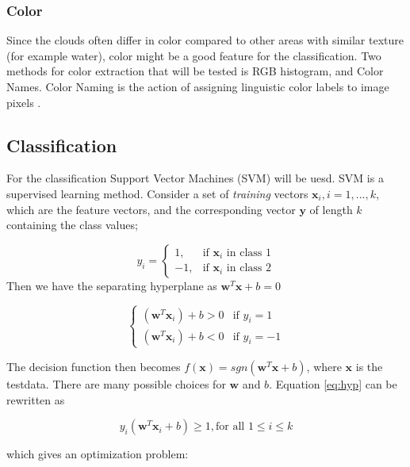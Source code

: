 \documentclass{article}
\begin{document}
\subsubsection{Color}
Since the clouds often differ in color compared to other areas with similar texture (for example water), color might be a good feature for the classification. Two methods for color extraction that will be tested is RGB histogram, and Color Names. Color Naming is the action of assigning linguistic color labels to image pixels \citep{colornames}.


\subsection{Classification}
For the classification Support Vector Machines (SVM) will be uesd. SVM is a supervised learning method. 
Consider a set of \textit{training} vectors $ \textbf{x}_{i}, i = 1,...,k $, which are the feature vectors, and the corresponding vector $ \textbf{y} $ of length $ k $ containing the class values; 

\begin{equation}
y_{i} =
\begin{cases}
1, & \text{if $\textbf{x}_{i}$ in class 1} \\
-1,
& \text{if $\textbf{x}_{i}$ in class 2}
\end{cases}
\end{equation}
Then we have the separating hyperplane as $\textbf{w}^{T}\textbf{x} + b = 0$

\begin{equation}
\label{eq:hyp}
\begin{cases}
(\textbf{w}^{T}\textbf{x}_{i}) + b > 0 & \text{if $y_{i} = 1$} \\
(\textbf{w}^{T}\textbf{x}_{i}) + b < 0 & \text{if $y_{i} = -1$}
\end{cases}
\end{equation}

The decision function then becomes $f(\textbf{x}) = sgn(\textbf{w}^{T}\textbf{x} + b)$, where $ \textbf{x} $ is the testdata. There are many possible choices for $\textbf{w}$ and $b$.
Equation \ref{eq:hyp} can be rewritten as 

\begin{equation}
y_{i}(\textbf{w}^{T}\textbf{x}_{i} + b) \geq 1, \text{for all $1 \leq i \leq k$}
\end{equation}

which gives an optimization problem: 
\end{document}
